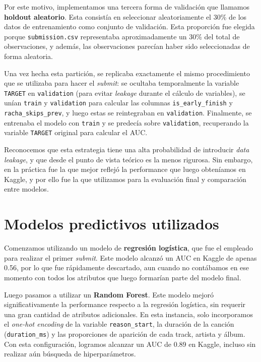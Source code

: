\documentclass{article}
\begin{document}
Por este motivo, implementamos una tercera forma de validación que llamamos \textbf{holdout aleatorio}. Esta consistía en seleccionar aleatoriamente el 30\% de los datos de entrenamiento como conjunto de validación. Esta proporción fue elegida porque \texttt{submission.csv} representaba aproximadamente un 30\% del total de observaciones, y además, las observaciones parecían haber sido seleccionadas de forma aleatoria. 

Una vez hecha esta partición, se replicaba exactamente el mismo procedimiento que se utilizaba para hacer el \textit{submit}: se ocultaba temporalmente la variable \texttt{TARGET} en \texttt{validation} (para evitar \textit{leakage} durante el cálculo de variables), se unían \texttt{train} y \texttt{validation} para calcular las columnas \texttt{is\_early\_finish} y \texttt{racha\_skips\_prev}, y luego estas se reintegraban en \texttt{validation}. Finalmente, se entrenaba el modelo con \texttt{train} y se predecía sobre \texttt{validation}, recuperando la variable \texttt{TARGET} original para calcular el AUC.

Reconocemos que esta estrategia tiene una alta probabilidad de introducir \textit{data leakage}, y que desde el punto de vista teórico es la menos rigurosa. Sin embargo, en la práctica fue la que mejor reflejó la performance que luego obteníamos en Kaggle, y por ello fue la que utilizamos para la evaluación final y comparación entre modelos.

\section*{Modelos predictivos utilizados}

Comenzamos utilizando un modelo de \textbf{regresión logística}, que fue el empleado para realizar el primer \textit{submit}. Este modelo alcanzó un AUC en Kaggle de apenas 0.56, por lo que fue rápidamente descartado, aun cuando no contábamos en ese momento con todos los atributos que luego formarían parte del modelo final.

Luego pasamos a utilizar un \textbf{Random Forest}. Este modelo mejoró significativamente la performance respecto a la regresión logística, sin requerir una gran cantidad de atributos adicionales. En esta instancia, solo incorporamos el \textit{one-hot encoding} de la variable \texttt{reason\_start}, la duración de la canción (\texttt{duration\_ms}) y las proporciones de aparición de cada track, artista y álbum. Con esta configuración, logramos alcanzar un AUC de 0.89 en Kaggle, incluso sin realizar aún búsqueda de hiperparámetros.
\end{document}
